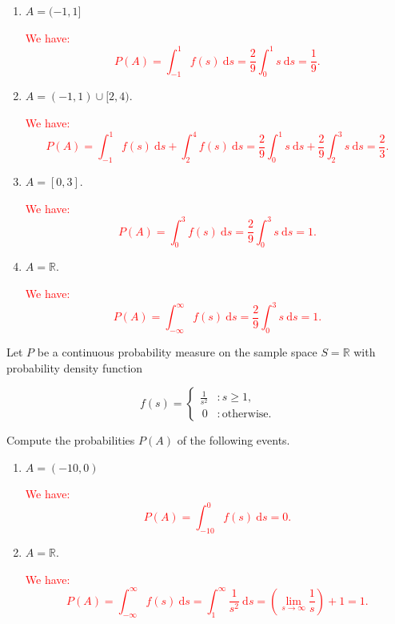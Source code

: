 \documentclass[12pt,reqno]{amsart}
\begin{document}
\medskip
\begin{enumerate}
\item $A=(-1, 1]$
    
\bigskip
\textcolor{red}{We have:
	\[
	P(A) = \int_{-1}^1 f(s) \ \text{d}s = \frac{2}{9}\int_0^1 s \ \text{d} s = \frac{1}{9}.
	\]}
\bigskip

\item $A = (-1,1) \cup [2, 4)$.
    
\bigskip
\textcolor{red}{We have:
	\[
	P(A) = \int_{-1}^1f(s) \ \text{d}s + \int_2^4 f(s) \ \text{d}s = \frac{2}{9} \int_0^1 s \ \text{d}s + \frac{2}{9} \int_2^3 s \ \text{d}s = \frac{2}{3}.
	\]}
\bigskip

\item $A = [0,3]$.
    
\bigskip
\textcolor{red}{We have:
	\[
	P(A) = \int_{0}^3f(s) \ \text{d}s = \frac{2}{9} \int_0^3 s \ \text{d}s =1.
	\]}
\bigskip

\item $A = \mathbb{R}$.
    
\bigskip
\textcolor{red}{We have:
	\[
	P(A) = \int_{-\infty}^\infty f(s) \ \text{d}s = \frac{2}{9} \int_0^3 s \ \text{d}s =1.
	\]}
\end{enumerate}











\bigskip
\prob Let $P$ be a continuous probability measure on the sample space $S=\mathbb{R}$ with probability density function

	\[
	f(s) = \begin{cases}
	\displaystyle\frac{1}{s^2} & : s \geq 1, \\\
	0 & : \text{otherwise}.    
	\end{cases}
	\]

Compute the probabilities $P(A)$ of the following events.

\medskip
\begin{enumerate}
\item $A=(-10, 0)$
    
\bigskip
\textcolor{red}{We have:
	\[
	P(A) = \int_{-10}^0 f(s) \ \text{d}s = 0.
	\]}
\bigskip

\item $A = \mathbb{R}$.
    
\bigskip
\textcolor{red}{We have:
	\[
	P(A) = \int_{-\infty}^\infty f(s) \ \text{d}s = \int_1^\infty \frac{1}{s^2} \ \text{d}s = \left(\lim_{s\to \infty} \frac{1}{s}\right) + 1 = 1.
	\]}
\end{enumerate}
\end{document}
